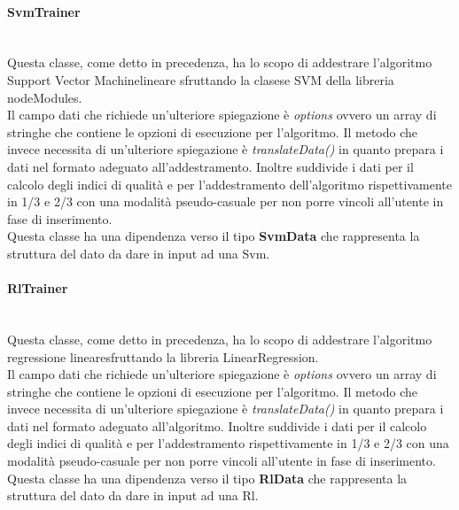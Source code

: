 		\paragraph*{SvmTrainer} \mbox{} \\[1mm]
		Questa classe, come detto in precedenza, ha lo scopo di addestrare l'algoritmo Support Vector Machine\glosp lineare sfruttando la clasese SVM della libreria nodeModules. \\
		Il campo dati che richiede un'ulteriore spiegazione è \textit{options} ovvero un array di stringhe che contiene le opzioni di esecuzione per l'algoritmo.
		Il metodo che invece necessita di un'ulteriore spiegazione è \textit{translateData()} in quanto prepara i dati nel formato adeguato all'addestramento. Inoltre suddivide i dati per il calcolo degli indici di qualità e per l'addestramento dell'algoritmo rispettivamente in 1/3 e 2/3 con una modalità pseudo-casuale per non porre vincoli all'utente in fase di inserimento. \\
		Questa classe ha una dipendenza verso il tipo \textbf{SvmData} che rappresenta la struttura del dato da dare in input ad una Svm\glo.
		\paragraph*{RlTrainer} \mbox{} \\[1mm]
		Questa classe, come detto in precedenza, ha lo scopo di addestrare l'algoritmo regressione lineare\glosp sfruttando la libreria LinearRegression. \\
		Il campo dati che richiede un'ulteriore spiegazione è \textit{options} ovvero un array di stringhe che contiene le opzioni di esecuzione per l'algoritmo.
		Il metodo che invece necessita di un'ulteriore spiegazione è \textit{translateData()} in quanto prepara i dati nel formato adeguato all'algoritmo. Inoltre suddivide i dati per il calcolo degli indici di qualità e per l'addestramento rispettivamente in 1/3 e 2/3 con una modalità pseudo-casuale per non porre vincoli all'utente in fase di inserimento. \\
		Questa classe ha una dipendenza verso il tipo \textbf{RlData} che rappresenta la struttura del dato da dare in input ad una Rl\glo.
